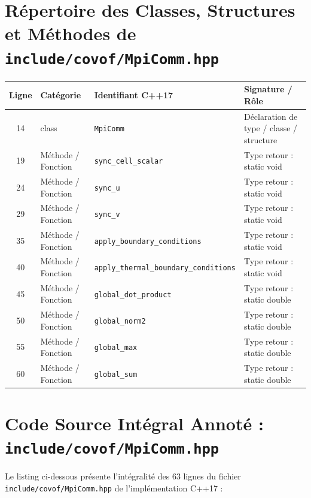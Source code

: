 \documentclass[10pt,a4paper,oneside]{book}
\begin{document}
\section{Répertoire des Classes, Structures et Méthodes de \texttt{include/covof/MpiComm.hpp}}
\begin{center}\small
\begin{tabular}{clll}
\toprule
\textbf{Ligne} & \textbf{Catégorie} & \textbf{Identifiant C++17} & \textbf{Signature / Rôle} \\
\midrule
14 & class & \texttt{MpiComm} & Déclaration de type / classe / structure \\
19 & Méthode / Fonction & \texttt{sync\_cell\_scalar} & Type retour : static void \\
24 & Méthode / Fonction & \texttt{sync\_u} & Type retour : static void \\
29 & Méthode / Fonction & \texttt{sync\_v} & Type retour : static void \\
35 & Méthode / Fonction & \texttt{apply\_boundary\_conditions} & Type retour : static void \\
40 & Méthode / Fonction & \texttt{apply\_thermal\_boundary\_conditions} & Type retour : static void \\
45 & Méthode / Fonction & \texttt{global\_dot\_product} & Type retour : static double \\
50 & Méthode / Fonction & \texttt{global\_norm2} & Type retour : static double \\
55 & Méthode / Fonction & \texttt{global\_max} & Type retour : static double \\
60 & Méthode / Fonction & \texttt{global\_sum} & Type retour : static double \\
\bottomrule
\end{tabular}
\end{center}

\section{Code Source Intégral Annoté : \texttt{include/covof/MpiComm.hpp}}
Le listing ci-dessous présente l'intégralité des 63 lignes du fichier \texttt{include/covof/MpiComm.hpp} de l'implémentation C++17 :
\end{document}
